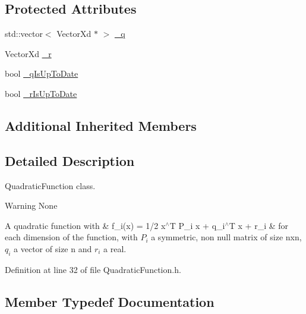 \subsection*{Protected Attributes}
\begin{DoxyCompactItemize}
\item 
std\+::vector$<$ Vector\+Xd $\ast$ $>$ \hyperlink{classocra_1_1QuadraticFunction_a0019bf700f128841e50dbceaa4c75dd2}{\+\_\+q}
\item 
Vector\+Xd \hyperlink{classocra_1_1QuadraticFunction_a56771e89a23a61fcc15cfd4d10c6956c}{\+\_\+r}
\item 
bool \hyperlink{classocra_1_1QuadraticFunction_adc8b30315f5cef54f2318c93844a6a66}{\+\_\+q\+Is\+Up\+To\+Date}
\item 
bool \hyperlink{classocra_1_1QuadraticFunction_a9862b46e064bccd9e83b10e9ceb4d2f0}{\+\_\+r\+Is\+Up\+To\+Date}
\end{DoxyCompactItemize}
\subsection*{Additional Inherited Members}


\subsection{Detailed Description}
Quadratic\+Function class. 

\begin{DoxyWarning}{Warning}
None
\end{DoxyWarning}
A quadratic function with \& f\+\_\+i(x) = 1/2 x$^\wedge$T P\+\_\+i x + q\+\_\+i$^\wedge$T x + r\+\_\+i \& for each dimension of the function, with $ P_i $ a symmetric, non null matrix of size nxn, $ q_i $ a vector of size n and $ r_i $ a real. 

Definition at line 32 of file Quadratic\+Function.\+h.



\subsection{Member Typedef Documentation}
\hypertarget{classocra_1_1QuadraticFunction_a224eecd300c5a16599ebd6e4eff5d9d7}{}\label{classocra_1_1QuadraticFunction_a224eecd300c5a16599ebd6e4eff5d9d7} 
